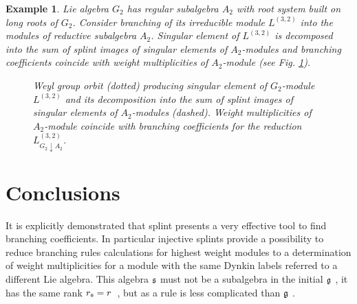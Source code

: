 \documentclass[12pt]{article}
\newtheorem{example}{Example}[section]
\begin{document}
\begin{example}
   Lie algebra $G_{2}$ has regular subalgebra $A_{2}$ with root system built on long roots of $G_{2}$. Consider branching of its irreducible module $L^{(3,2)}$ into the modules of reductive subalgebra $A_{2}$. Singular element of $L^{(3,2)}$ is decomposed into the sum of splint images of singular elements of $A_{2}$-modules and branching coefficients coincide with weight multiplicities of $A_{2}$-module (see Fig. \ref{fig:g2_splint}).


  \begin{figure}[h!bt]
  \noindent{}

  \caption{Weyl group orbit (dotted) producing singular element of $G_{2}$-module $L^{(3,2)}$ and its decomposition into the sum of splint images of singular elements of $A_{2}$-modules (dashed). Weight multiplicities of $A_{2}$-module coincide with branching coefficients for the reduction $L^{(3,2)}_{G_{2}\downarrow A_{2}}$.}


 \label{fig:g2_splint}
\end{figure}

\end{example}

\section{Conclusions}

\label{sec:conclusions}It is explicitly demonstrated that splint
presents a very effective tool to find branching coefficients. In
particular injective splints provide a possibility to reduce
branching rules calculations for highest weight modules to a
determination of weight multiplicities for a module with the same
Dynkin labels referred to a different Lie algebra. This algebra
$\frak{s}$ must not be a subalgebra in the initial $\frak{g}$ , it
has the same rank $r_{\frak{s}}=r$\ , but as a rule is less
complicated than $\frak{g}$ .
\end{document}
